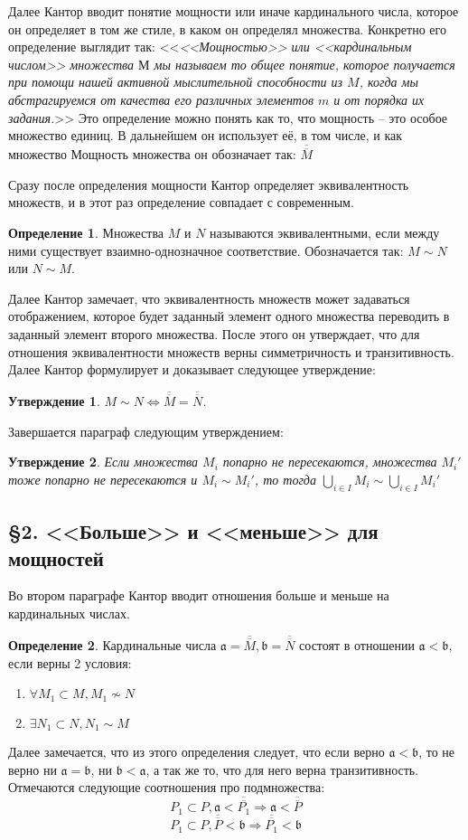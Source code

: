 \documentclass[a4paper,12pt]{extarticle}
\newtheorem{utv}{Утверждение}
\theoremstyle{definition}
\newtheorem{definition}{Определение}
\newcommand{\cit}[1]{<<\textit{#1}>>}
\newcommand{\car}[1]{\overline{\overline{#1}}}
\begin{document}
Далее Кантор вводит понятие мощности или иначе кардинального числа, которое он определяет в том же стиле, в каком он определял множества.
Конкретно его определение выглядит так:
\cit{<<Мощностью>> или <<кардинальным числом>> множества $М$ мы называем то общее понятие,
которое получается при помощи нашей активной мыслительной способности из $M$,
когда мы абстрагируемся от качества его различных элементов $m$ и от порядка их задания.}
Это определение можно понять как то, что мощность -- это особое множество единиц.
В дальнейшем он использует её, в том числе, и как множество
Мощность множества он обозначает так: $\car{M}$

Сразу после определения мощности Кантор определяет эквивалентность множеств, и в этот раз определение совпадает с современным.
\begin{definition}
Множества $M$ и $N$ называются эквивалентными, если между ними существует взаимно-однозначное соответствие. Обозначается так: $M \sim N$ или $N \sim M$.
\end{definition}

Далее Кантор замечает, что эквивалентность множеств может задаваться отображением, которое будет заданный элемент одного множества переводить в заданный элемент второго множества.
После этого он утверждает, что для отношения эквивалентности множеств верны симметричность и транзитивность.
Далее Кантор формулирует и доказывает следующее утверждение:
\begin{utv}
\label{simeq}
    $M \sim N \iff \car{M} = \car{N}$.
\end{utv}
Завершается параграф следующим утверждением:
\begin{utv}
\label{manysim}
Если множества $M_i$ попарно не пересекаются, множества $M_i'$ тоже попарно не пересекаются и $M_i \sim M_i'$, то тогда $\bigcup\limits_{i \in I} M_i \sim \bigcup\limits_{i \in I} M_i'$
\end{utv}

\subsection{\S 2. <<Больше>> и <<меньше>> для мощностей}
Во втором параграфе Кантор вводит отношения больше и меньше на кардинальных числах.
\begin{definition}
    \label{def-less}
    Кардинальные числа $\mathfrak{a} = \car{M}, \mathfrak{b} = \car{N}$ состоят в отношении $\mathfrak{a} < \mathfrak{b}$, если верны 2 условия:
    \begin{enumerate}
        \item $\forall M_1 \subset M, M_1 \nsim N$
        \item $\exists N_1 \subset N, N_1 \sim M$
    \end{enumerate}
\end{definition}
Далее замечается, что из этого определения следует, что если верно $\mathfrak{a} < \mathfrak{b}$, то не верно ни $\mathfrak{a} = \mathfrak{b}$, ни $\mathfrak{b} < \mathfrak{a}$,
а так же то, что для него верна транзитивность.
Отмечаются следующие соотношения про подмножества:
$$
P_1 \subset P, \mathfrak{a} < \car{P_1} \Rightarrow \mathfrak{a} < \car{P}
$$
$$
P_1 \subset P, \car{P} < \mathfrak{b} \Rightarrow \car{P_1} < \mathfrak{b}
$$
\end{document}
